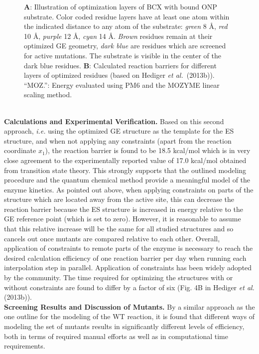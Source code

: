 \begin{figure}[htbp]
\begin{minipage}{0.51\linewidth}
\end{minipage}
\caption{
\textbf{A}: Illustration of optimization layers of BCX with bound ONP substrate.
Color coded residue layers have at least one atom within the indicated distance to any atom of the substrate:
\textit{green} 8 \AA, \textit{red} 10 \AA, \textit{purple} 12 \AA, \textit{cyan} 14 \AA.
\textit{Brown} residues remain at their optimized GE geometry, \textit{dark blue} are residues which are screened for active mutations.
The substrate is visible in the center of the dark blue residues.
\textbf{B}: Calculated reaction barriers for different layers of optimized residues (based on Hediger \textit{et al.} (2013b)).
``MOZ.'': Energy evaluated using PM6 and the MOZYME linear scaling method.
}
\label{fig:bcx_constr_constraint_layers}
\end{figure}
\\
\textbf{Calculations and Experimental Verification.}
Based on this second approach, \textit{i.e.} using the optimized GE structure as the template for the ES structure, and when not applying any constraints (apart from the reaction coordinate $x_1$), the reaction barrier is found to be 18.5 kcal/mol which is in very close agreement to the experimentally reported value of 17.0 kcal/mol obtained from transition state theory\cite{joshi2000hydrogen}.
This strongly supports that the outlined modeling procedure and the quantum chemical method provide a meaningful model of the enzyme kinetics.
As pointed out above, when applying constraints on parts of the structure which are located away from the active site, this can decrease the reaction barrier because the ES structure is increased in energy relative to the GE reference point (which is set to zero).
However, it is reasonable to assume that this relative increase will be the same for all studied structures and so cancels out once mutants are compared relative to each other.  
Overall, application of constraints to remote parts of the enzyme is necessary to reach the desired calculation efficiency of one reaction barrier per day when running each interpolation step in parallel.
Application of constraints has been widely adopted by the community\cite{himo2006quantum,siegbahn2009recent,liao2012comparison,lonsdale2013quantum}.
The time required for optimizing the structures with or without constraints are found to differ by a factor of six (Fig. 4B in Hediger \textit{et al.} (2013b)).\\
\textbf{Screening Results and Discussion of Mutants.}
By a similar approach as the one outline for the modeling of the WT reaction, it is found that different ways of modeling the set of mutants results in significantly different levels of efficiency, both in terms of required manual efforts as well as in computational time requirements.
